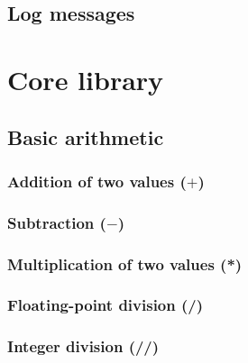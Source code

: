 \documentclass{article}
\theoremstyle{definition}
\begin{document}

\hypertarget{hsec:logs}{}
\subsection{Log messages}
\label{sec:logs}


\pagebreak

\section{Core library}

\subsection{Basic arithmetic}

\subsubsection{Addition of two values ($+$)}

\subsubsection{Subtraction ($-$)}

\subsubsection{Multiplication of two values (*)}

\subsubsection{Floating-point division (/)}

\subsubsection{Integer division (//)}
\end{document}
